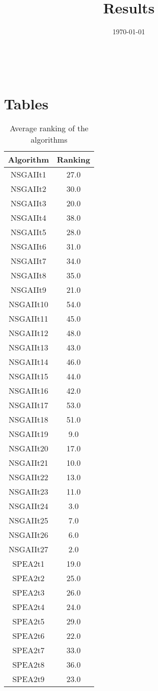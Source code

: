 \documentclass{article}
\title{Results}
\author{}
\date{\today}
\begin{document}
\oddsidemargin 0in \topmargin 0in\maketitle
\
\section{Tables}
\begin{table}[!htp]
\centering
\caption{Average ranking of the algorithms}
\begin{tabular}{c|c}
Algorithm&Ranking\\
\hline
NSGAIIt1&27.0\\
NSGAIIt2&30.0\\
NSGAIIt3&20.0\\
NSGAIIt4&38.0\\
NSGAIIt5&28.0\\
NSGAIIt6&31.0\\
NSGAIIt7&34.0\\
NSGAIIt8&35.0\\
NSGAIIt9&21.0\\
NSGAIIt10&54.0\\
NSGAIIt11&45.0\\
NSGAIIt12&48.0\\
NSGAIIt13&43.0\\
NSGAIIt14&46.0\\
NSGAIIt15&44.0\\
NSGAIIt16&42.0\\
NSGAIIt17&53.0\\
NSGAIIt18&51.0\\
NSGAIIt19&9.0\\
NSGAIIt20&17.0\\
NSGAIIt21&10.0\\
NSGAIIt22&13.0\\
NSGAIIt23&11.0\\
NSGAIIt24&3.0\\
NSGAIIt25&7.0\\
NSGAIIt26&6.0\\
NSGAIIt27&2.0\\
SPEA2t1&19.0\\
SPEA2t2&25.0\\
SPEA2t3&26.0\\
SPEA2t4&24.0\\
SPEA2t5&29.0\\
SPEA2t6&22.0\\
SPEA2t7&33.0\\
SPEA2t8&36.0\\
SPEA2t9&23.0\\

\end{tabular}
\end{table}
\end{document}
